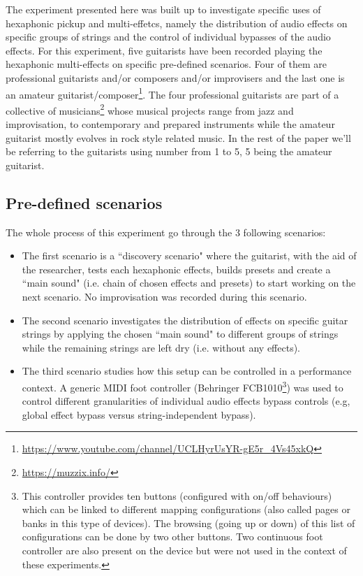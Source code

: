 \documentclass{article}
\begin{document}
The experiment presented here was built up to investigate specific uses of hexaphonic pickup and multi-effetcs, namely the distribution of audio effects on specific groups of strings and the control of individual bypasses of the audio effects. 
For this experiment, five guitarists have been recorded playing the hexaphonic multi-effects on specific pre-defined scenarios. Four of them are professional guitarists and/or composers and/or improvisers and the last one is an amateur guitarist/composer\footnote{\href{https://www.youtube.com/channel/UCLHyrUsYR-gE5r\_4Vs45xkQ}{https://www.youtube.com/channel/UCLHyrUsYR-gE5r\_4Vs45xkQ}}. The four professional guitarists are part of a collective of musicians\footnote{\href{https://muzzix.info/}{https://muzzix.info/}} whose musical projects range from jazz and improvisation, to contemporary and prepared instruments while the amateur guitarist mostly evolves in rock style related music. In the rest of the paper we'll be referring to the guitarists using number from 1 to 5, 5 being the amateur guitarist. 


\subsection{Pre-defined scenarios}
The whole process of this experiment go through the 3 following scenarios:
\begin{itemize}
    \item The first scenario is a ``discovery scenario" where the guitarist, with the aid of the researcher, tests each hexaphonic effects, builds presets and create a ``main sound" (i.e. chain of chosen effects and presets) to start working on the next scenario. No improvisation was recorded during this scenario.  
    
    \item The second scenario investigates the distribution of effects on specific guitar strings by applying the chosen ``main sound" to different groups of strings while the remaining strings are left dry (i.e. without any effects).
    
    \item The third scenario studies how this setup can be controlled in a performance context. A generic MIDI foot controller (Behringer FCB1010\footnote{\label{foot:Behringer1010}This controller provides ten buttons (configured with on/off behaviours) which can be linked to different mapping configurations (also called pages or banks in this type of devices). The browsing (going up or down) of this list of configurations can be done by two other buttons. Two continuous foot controller are also present on the device but were not used in the context of these experiments.}) was used to control different granularities of individual audio effects bypass controls (e.g, global effect bypass versus string-independent bypass). 
\end{itemize} 
\end{document}
